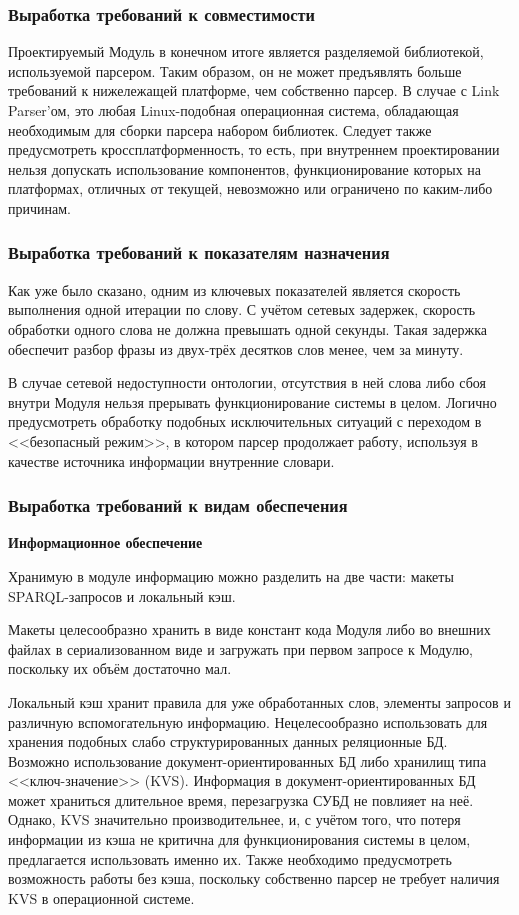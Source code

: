 \subsubsection{Выработка требований к совместимости}

Проектируемый Модуль в конечном итоге является разделяемой библиотекой, используемой парсером. Таким образом, он не может предъявлять больше требований к нижележащей платформе, чем собственно парсер. В случае с Link Parser'ом, это любая Linux-подобная операционная система, обладающая необходимым для сборки парсера набором библиотек. Следует также предусмотреть кроссплатформенность, то есть, при внутреннем проектировании нельзя допускать использование компонентов, функционирование которых на платформах, отличных от текущей, невозможно или ограничено по каким-либо причинам.

\subsubsection{Выработка требований к показателям назначения}

Как уже было сказано, одним из ключевых показателей является скорость выполнения одной итерации по слову. С учётом сетевых задержек, скорость обработки одного слова не должна превышать одной секунды. Такая задержка обеспечит разбор фразы из двух-трёх десятков слов менее, чем за минуту.

В случае сетевой недоступности онтологии, отсутствия в ней слова либо сбоя внутри Модуля нельзя прерывать функционирование системы в целом. Логично предусмотреть обработку подобных исключительных ситуаций с переходом в <<безопасный режим>>, в котором парсер продолжает работу, используя в качестве источника информации внутренние словари.

\subsubsection{Выработка требований к видам обеспечения}

\textbf{Информационное обеспечение}

Хранимую в модуле информацию можно разделить на две части: макеты SPARQL-запросов и локальный кэш. 

Макеты целесообразно хранить в виде констант кода Модуля либо во внешних файлах в сериализованном виде и загружать при первом запросе к Модулю, поскольку их объём достаточно мал.

Локальный кэш хранит правила для уже обработанных слов, элементы запросов и различную вспомогательную информацию. Нецелесообразно использовать для хранения подобных слабо структурированных данных реляционные БД. Возможно использование документ-ориентированных БД либо хранилищ типа <<ключ-значение>> (KVS). Информация в документ-ориентированных БД может храниться длительное время, перезагрузка СУБД не повлияет на неё. Однако, KVS значительно производительнее, и, с учётом того, что потеря информации из кэша не критична для функционирования системы в целом, предлагается использовать именно их. Также необходимо предусмотреть возможность работы без кэша, поскольку собственно парсер не требует наличия KVS в операционной системе.

